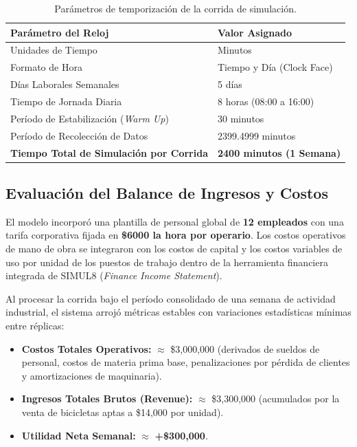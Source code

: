 \documentclass[runningheads]{llncs}
\begin{document}
\begin{table}[h]
\centering
\caption{Parámetros de temporización de la corrida de simulación.}
\label{tab:parametros}
\begin{tabular}{ll}
\toprule
\textbf{Parámetro del Reloj} & \textbf{Valor Asignado} \\ \midrule
Unidades de Tiempo & Minutos \\
Formato de Hora & Tiempo y Día (Clock Face) \\
Días Laborales Semanales & 5 días \\
Tiempo de Jornada Diaria & 8 horas (08:00 a 16:00) \\
Período de Estabilización (\textit{Warm Up}) & 30 minutos \\
Período de Recolección de Datos & 2399.4999 minutos \\
\textbf{Tiempo Total de Simulación por Corrida} & \textbf{2400 minutos (1 Semana)} \\ \bottomrule
\end{tabular}
\end{table}

\subsection{Evaluación del Balance de Ingresos y Costos}
El modelo incorporó una plantilla de personal global de \textbf{12 empleados} con una tarifa corporativa fijada en \textbf{\$6000 la hora por operario}. Los costos operativos de mano de obra se integraron con los costos de capital y los costos variables de uso por unidad de los puestos de trabajo dentro de la herramienta financiera integrada de SIMUL8 (\textit{Finance Income Statement}). 

Al procesar la corrida bajo el período consolidado de una semana de actividad industrial, el sistema arrojó métricas estables con variaciones estadísticas mínimas entre réplicas:

\begin{itemize}
    \item \textbf{Costos Totales Operativos:} $\approx$ \$3,000,000 (derivados de sueldos de personal, costos de materia prima base, penalizaciones por pérdida de clientes y amortizaciones de maquinaria).
    \item \textbf{Ingresos Totales Brutos (Revenue):} $\approx$ \$3,300,000 (acumulados por la venta de bicicletas aptas a \$14,000 por unidad).
    \item \textbf{Utilidad Neta Semanal:} $\approx$ \textbf{+\$300,000}.
\end{itemize}
\end{document}
